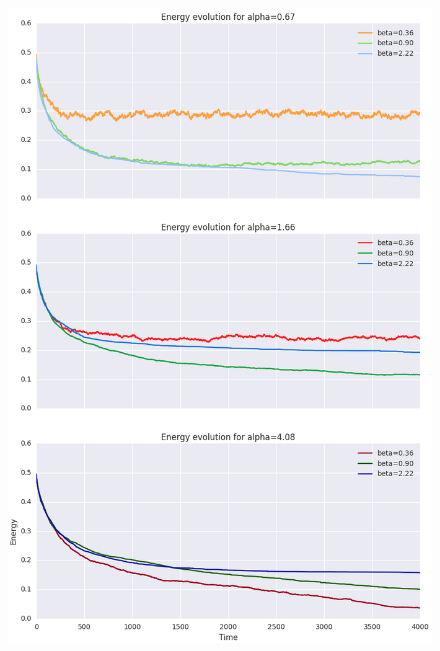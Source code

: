 \documentclass[twocolumn]{article}
\begin{document}
\begin{figure}[!h]
	\includegraphics[width=\columnwidth]{../tobekept/ex1_5356565168118681029-r.png}
\end{figure}
\end{document}
